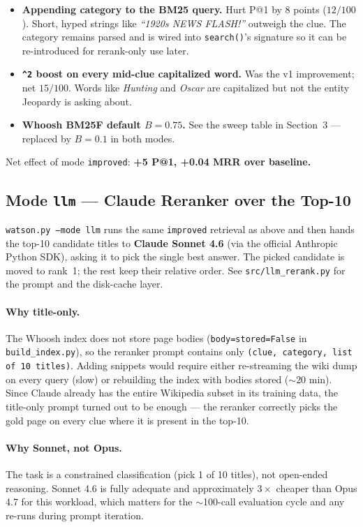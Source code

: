 \documentclass[11pt]{article}
\begin{document}
\begin{itemize}
  \item \textbf{Appending category to the BM25 query.} Hurt P@1 by 8 points
        ($12/100$). Short, hyped strings like \emph{``1920s NEWS FLASH!''}
        outweigh the clue. The category remains parsed and is wired into
        \texttt{search()}'s signature so it can be re-introduced for
        rerank-only use later.
  \item \textbf{\texttt{\^{}2} boost on every mid-clue capitalized word.} Was
        the v1 improvement; net $15/100$. Words like \emph{Hunting} and
        \emph{Oscar} are capitalized but not the entity Jeopardy is asking
        about.
  \item \textbf{Whoosh BM25F default $B = 0.75$.} See the sweep table in
        Section~3 --- replaced by $B = 0.1$ in both modes.
\end{itemize}

Net effect of mode \texttt{improved}: \textbf{+5 P@1, +0.04 MRR over baseline.}

\subsection{Mode \texttt{llm} --- Claude Reranker over the Top-10}

\texttt{watson.py --mode llm} runs the same \texttt{improved} retrieval
as above and then hands the top-10 candidate titles to
\textbf{Claude Sonnet 4.6} (via the official Anthropic Python SDK),
asking it to pick the single best answer. The picked candidate is
moved to rank~1; the rest keep their relative order. See
\texttt{src/llm\_rerank.py} for the prompt and the disk-cache layer.

\paragraph{Why title-only.} The Whoosh index does not store page
bodies (\texttt{body=stored=False} in \texttt{build\_index.py}), so the
reranker prompt contains only \texttt{(clue, category, list of 10
titles)}. Adding snippets would require either re-streaming the wiki
dump on every query (slow) or rebuilding the index with bodies stored
($\sim$20 min). Since Claude already has the entire Wikipedia subset in
its training data, the title-only prompt turned out to be enough --- the
reranker correctly picks the gold page on every clue where it is
present in the top-10.

\paragraph{Why Sonnet, not Opus.} The task is a constrained
classification (pick 1 of 10 titles), not open-ended reasoning. Sonnet
4.6 is fully adequate and approximately $3\times$ cheaper than Opus 4.7
for this workload, which matters for the $\sim$100-call evaluation
cycle and any re-runs during prompt iteration.
\end{document}
